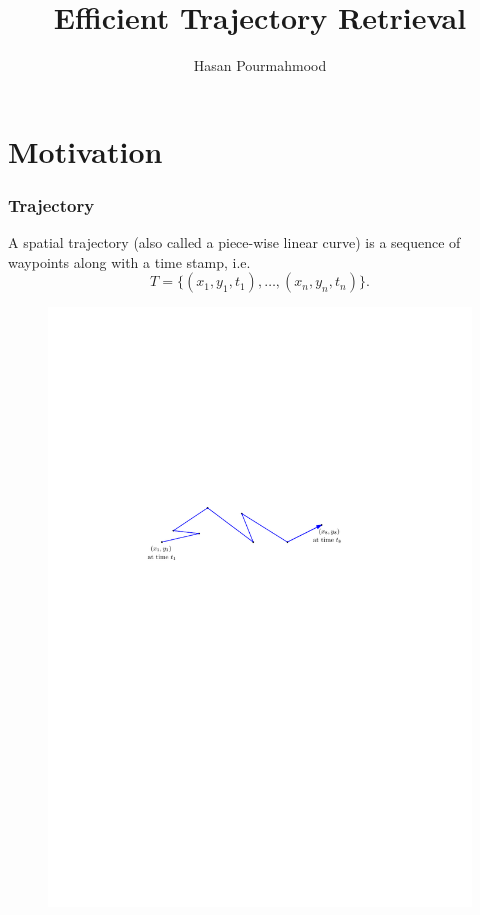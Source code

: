 \documentclass{beamer}
\title{Efficient Trajectory Retrieval}
\author{Hasan Pourmahmood}
\begin{document}
\frame{\titlepage}


\section{Motivation}

\begin{frame} 
\frametitle{Trajectory}
\begin{block}{}
A spatial trajectory (also called a piece-wise linear curve) is a sequence of waypoints along with a time stamp, i.e. 
$$T=\{(x_1, y_1, t_1), \ldots, (x_n, y_n, t_n)\}.$$
\begin{figure}[h] 
\includegraphics[width=0.8 \textwidth]{trajectory} 
\end{figure}  \vspace{-1mm}
\end{block} 
\end{frame}
\end{document}
